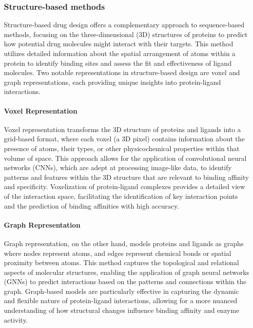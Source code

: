 \subsubsection{Structure-based methods}

Structure-based drug design offers a complementary approach to sequence-based methods, focusing on the three-dimensional (3D) structures of proteins to predict how potential drug molecules might interact with their targets. \cite{OVCHINNIKOV2021136} This method utilizes detailed information about the spatial arrangement of atoms within a protein to identify binding sites and assess the fit and effectiveness of ligand molecules. Two notable representations in structure-based design are voxel and graph representations, each providing unique insights into protein-ligand interactions.

\paragraph{Voxel Representation}
Voxel representation transforms the 3D structure of proteins and ligands into a grid-based format, where each voxel (a 3D pixel) contains information about the presence of atoms, their types, or other physicochemical properties within that volume of space. This approach allows for the application of convolutional neural networks (CNNs), which are adept at processing image-like data, to identify patterns and features within the 3D structure that are relevant to binding affinity and specificity. \cite{Pu2019DeepDrug3D} Voxelization of protein-ligand complexes provides a detailed view of the interaction space, facilitating the identification of key interaction points and the prediction of binding affinities with high accuracy.

\paragraph{Graph Representation}
Graph representation, on the other hand, models proteins and ligands as graphs where nodes represent atoms, and edges represent chemical bonds or spatial proximity between atoms. \cite{STROKACH2020402,10095229,Jing2021GeometricVP} This method captures the topological and relational aspects of molecular structures, enabling the application of graph neural networks (GNNs) to predict interactions based on the patterns and connections within the graph. Graph-based models are particularly effective in capturing the dynamic and flexible nature of protein-ligand interactions, allowing for a more nuanced understanding of how structural changes influence binding affinity and enzyme activity.

